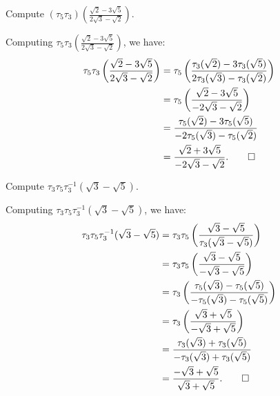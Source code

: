 \begin{problem}[43.12]
  Compute $(\tau_5\tau_3)\left(\frac{\sqrt{2} - 3\sqrt{5}}{2\sqrt{3} - \sqrt{2}}\right)$.
\end{problem}

\begin{solution}
  Computing $\tau_5\tau_3\left(\frac{\sqrt{2} - 3\sqrt{5}}{2\sqrt{3} - \sqrt{2}}\right)$, we have:
  \begin{align*}
    \tau_5\tau_3\left(\frac{\sqrt{2} - 3\sqrt{5}}{2\sqrt{3} - \sqrt{2}}\right) &= \tau_5\left(\frac{\tau_3(\sqrt{2}) - 3\tau_3(\sqrt{5})}{2\tau_3(\sqrt{3}) - \tau_3(\sqrt{2})}\right) \\
                                                                               &= \tau_5\left(\frac{\sqrt{2} - 3\sqrt{5}}{-2\sqrt{3} - \sqrt{2}}\right) \\
                                                                                &= \frac{\tau_5(\sqrt{2}) - 3\tau_5(\sqrt{5})}{-2\tau_5(\sqrt{3}) - \tau_5(\sqrt{2})} \\
                                                                                &= \frac{\sqrt{2} + 3\sqrt{5}}{-2\sqrt{3} - \sqrt{2}}
  .\qedhere\end{align*}
\end{solution}

\begin{problem}[43.15]
  Compute $\tau_3\tau_5\tau_3^{-1}(\sqrt{3} - \sqrt{5})$.
\end{problem}

\begin{solution}
  Computing $\tau_3\tau_5\tau_3^{-1}(\sqrt{3} - \sqrt{5})$, we have:
  \begin{align*}
    \tau_3\tau_5\tau_3^{-1}(\sqrt{3} - \sqrt{5}) &= \tau_3\tau_5\left(\frac{\sqrt{3} - \sqrt{5}}{\tau_3(\sqrt{3} - \sqrt{5})}\right) \\
                                                  &= \tau_3\tau_5\left(\frac{\sqrt{3} - \sqrt{5}}{-\sqrt{3} - \sqrt{5}}\right) \\
                                                  &= \tau_3\left(\frac{\tau_5(\sqrt{3}) - \tau_5(\sqrt{5})}{-\tau_5(\sqrt{3}) - \tau_5(\sqrt{5})}\right) \\
                                                  &= \tau_3\left(\frac{\sqrt{3} + \sqrt{5}}{-\sqrt{3} + \sqrt{5}}\right) \\
                                                  &= \frac{\tau_3(\sqrt{3}) + \tau_3(\sqrt{5})}{-\tau_3(\sqrt{3}) + \tau_3(\sqrt{5})} \\
                                                  &= \frac{-\sqrt{3} + \sqrt{5}}{\sqrt{3} + \sqrt{5}}
  .\qedhere\end{align*}
\end{solution}

